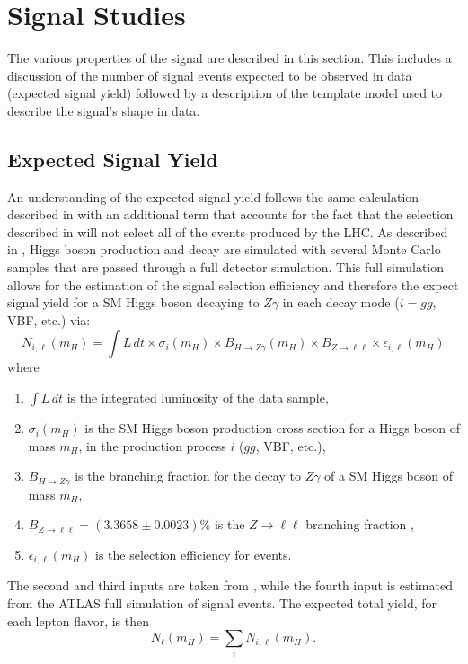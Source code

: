 \section{Signal Studies}
\label{sec:signal}
The various properties of the \HToZg signal are described in this section.
This includes a discussion of the number of signal events expected to be
observed in data (expected signal yield) followed by a description
of the template model used to describe the signal's shape in data.

\subsection{Expected Signal Yield}
An understanding of the expected signal yield follows the same calculation
described in  with an additional term that accounts
for the fact that the selection described in  will not
select all of the \HTollg events produced by the LHC. As described in
, Higgs boson production and decay are simulated with
several Monte Carlo samples that are passed through a full detector simulation.
This full simulation allows for the estimation of the signal selection efficiency
and therefore the expect signal yield for a SM Higgs boson decaying to $Z\gamma$
in each decay mode ($i = gg$, VBF, etc.) via:
\[
    N_{i,\ell}(m_H) = \int L\, dt \times \sigma_i(m_H) \times 
    B_{H\to Z\gamma}(m_H) \times B_{Z\to\ell\ell} \times \epsilon_{i,\ell}(m_H)
\]
where
\begin{enumerate}
 \item $\int L\, dt$ is the integrated luminosity of the data sample,
 \item $\sigma_i(m_H)$ is the SM Higgs boson production cross section for a
 Higgs boson of mass $m_H$, in the production process $i$ ($gg$, VBF, etc.),
 \item $B_{H\to Z\gamma}$ is the branching fraction for the decay to $Z\gamma$
 of a SM Higgs boson of mass $m_H$,
 \item $B_{Z\to\ell\ell} = (3.3658 \pm 0.0023)\%$ is the $Z\to\ell\ell$ branching
 fraction \cite{PDG2012},
 \item $\epsilon_{i,\ell}(m_H)$ is the selection efficiency for \HTollg events.
\end{enumerate}
The second and third inputs are taken from
\cite{LHCHiggsCrossSectionWorkingGroup:2011ti, LHCHiggsCrossSectionWorkingGroup:2012vm}, 
while the fourth input is estimated from the ATLAS full simulation of signal events.
The expected total yield, for each lepton flavor, is then 
\[
    N_{\ell}(m_H) = \sum_i N_{i,\ell}(m_H).
\]

